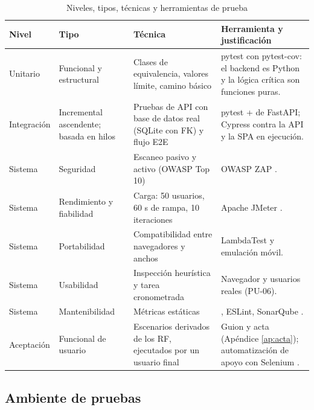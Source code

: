 \begin{table}[H]
\caption{Niveles, tipos, técnicas y herramientas de prueba}
\label{tab:estrategia}
\footnotesize
\begin{tabularx}{\linewidth}{L{1.9cm} L{2.5cm} L{3.8cm} Y}
\toprule
Nivel & Tipo & Técnica & Herramienta y justificación \\
\midrule
Unitario & Funcional y estructural & Clases de equivalencia, valores límite, camino básico \parencite{mccabe1976} & pytest \parencite{pytest2025} con pytest-cov: el backend es Python y la lógica crítica son funciones puras. \\
Integración & Incremental ascendente; basada en hilos & Pruebas de API con base de datos real (SQLite con FK) y flujo E2E & pytest +  de FastAPI; Cypress \parencite{cypress2025} contra la API y la SPA en ejecución. \\
Sistema & Seguridad & Escaneo pasivo y activo (OWASP Top 10) & OWASP ZAP \parencite{zap2025,owasp2021}. \\
Sistema & Rendimiento y fiabilidad & Carga: 50 usuarios, 60 s de rampa, 10 iteraciones & Apache JMeter \parencite{jmeter2025}. \\
Sistema & Portabilidad & Compatibilidad entre navegadores y anchos & LambdaTest \parencite{lambdatest2025} y emulación móvil. \\
Sistema & Usabilidad & Inspección heurística y tarea cronometrada & Navegador y usuarios reales (PU-06). \\
Sistema & Mantenibilidad & Métricas estáticas & , ESLint, SonarQube \parencite{sonarqube2025}. \\
Aceptación & Funcional de usuario & Escenarios derivados de los RF, ejecutados por un usuario final & Guion y acta (Apéndice \ref{ap:acta}); automatización de apoyo con Selenium \parencite{selenium2025}. \\
\bottomrule
\end{tabularx}
\end{table}

\subsection{Ambiente de pruebas}

